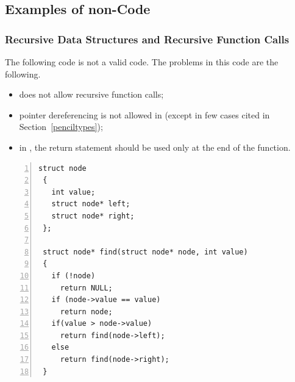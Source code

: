 \subsection{Examples of non-\pencil Code}

\subsubsection{Recursive Data Structures and Recursive Function Calls}

The following code is not a valid \pencil code.  The problems in this
code are the following.
\begin{itemize}
  \item \pencil does not allow recursive function calls;
  \item pointer dereferencing is not allowed in \pencil (except
        in few cases cited in Section~\ref{penciltypes});
  \item in \pencil, the return statement should be used only at
        the end of the function.
\end{itemize}

\begin{lstlisting}[language=pencil,escapechar=@, numbers=left,numberstyle={\tiny\tt},numbersep=5pt]
 struct node
 {
   int value;
   struct node* left;
   struct node* right;
 };

 struct node* find(struct node* node, int value)
 {
   if (!node)
     return NULL;
   if (node->value == value)
     return node;
   if(value > node->value)
     return find(node->left);
   else
     return find(node->right);
 }
\end{lstlisting}

